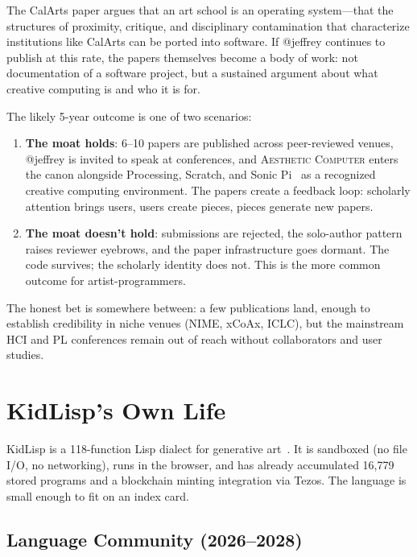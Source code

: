 \documentclass[10pt,letterpaper,twocolumn]{article}
\newcommand{\ac}{\textsc{Aesthetic Computer}}
\begin{document}
The CalArts paper argues that an art school is an operating system---that the structures of proximity, critique, and disciplinary contamination that characterize institutions like CalArts can be ported into software. If @jeffrey continues to publish at this rate, the papers themselves become a body of work: not documentation of a software project, but a sustained argument about what creative computing is and who it is for.

The likely 5-year outcome is one of two scenarios:

\begin{enumerate}
  \item \textbf{The moat holds}: 6--10 papers are published across peer-reviewed venues, @jeffrey is invited to speak at conferences, and \ac{} enters the canon alongside Processing, Scratch, and Sonic Pi~\citep{aaron2016sonic} as a recognized creative computing environment. The papers create a feedback loop: scholarly attention brings users, users create pieces, pieces generate new papers.
  \item \textbf{The moat doesn't hold}: submissions are rejected, the solo-author pattern raises reviewer eyebrows, and the paper infrastructure goes dormant. The code survives; the scholarly identity does not. This is the more common outcome for artist-programmers.
\end{enumerate}

The honest bet is somewhere between: a few publications land, enough to establish credibility in niche venues (NIME, xCoAx, ICLC), but the mainstream HCI and PL conferences remain out of reach without collaborators and user studies.


\section{KidLisp's Own Life}
\label{sec:kidlisp}

KidLisp is a 118-function Lisp dialect for generative art~\citep{scudder2026kidlisp}. It is sandboxed (no file I/O, no networking), runs in the browser, and has already accumulated 16,779 stored programs and a blockchain minting integration via Tezos. The language is small enough to fit on an index card.

\subsection{Language Community (2026--2028)}
\end{document}
